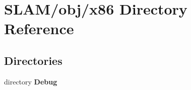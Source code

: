 \section{S\-L\-A\-M/obj/x86 Directory Reference}
\label{dir_02ffda77f25aad8bd6f830951f628e66}
\subsection*{Directories}
\begin{DoxyCompactItemize}
\item 
directory {\bf Debug}
\end{DoxyCompactItemize}
